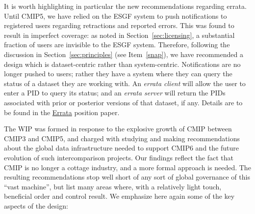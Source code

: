\documentclass[gmd,manuscript]{copernicus}
\newcommand{\secref}[1] {\mbox{Section  \ref{sec:#1}}}
\begin{document}
It is worth highlighting in particular the new recommendations
regarding errata. Until CMIP5, we have relied on the ESGF system to
push notifications to registered users regarding retractions and
reported errors. This was found to result in imperfect coverage: as
noted in \secref{licensing}, a substantial fraction of users are
invisible to the ESGF system. Therefore, following the discussion in
\secref{principles} (see Item~\ref{snap}), we have recommended a
design which is dataset-centric rather than system-centric.
Notifications are no longer pushed to users; rather they have a system
where they can query the status of a dataset they are working with. An
\emph{errata client} will allow the user to enter a PID to query its
status; and an \emph{errata server} will return the PIDs associated
with prior or posterior versions of that dataset, if any. Details are
to be found in the \href{https://goo.gl/qjs8WK}{Errata} position
paper.

\label{sec:summary}

The WIP was formed in response to the explosive growth of CMIP between
CMIP3 and CMIP5, and charged with studying and making recommendations
about the global data infrastructure needed to support CMIP6 and the
future evolution of such intercomparison projects.
Our findings reflect the fact that CMIP is no longer
a cottage industry, and a more formal approach is needed. The resulting
recommendations stop well short of any sort of global governance of
this ``vast machine'', but list many areas where, with a relatively
light touch, beneficial order and control result. We
emphasize here again some of the key aspects of the design:
\end{document}

